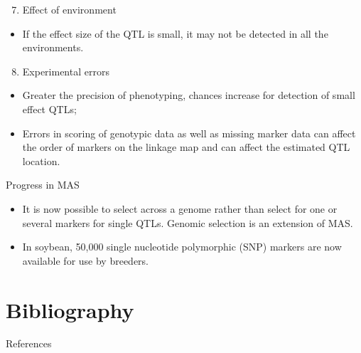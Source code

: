 \documentclass[
  ignorenonframetext,
  aspectratio=169]{beamer}
\providecommand{\tightlist}{%
  \setlength{\itemsep}{0pt}\setlength{\parskip}{0pt}}
\begin{document}
\begin{frame}{}
\protect\hypertarget{section-4}{}
\begin{enumerate}
\setcounter{enumi}{6}
\tightlist
\item
  Effect of environment
\end{enumerate}

\begin{itemize}
\tightlist
\item
  If the effect size of the QTL is small, it may not be detected in all
  the environments.
\end{itemize}

\begin{enumerate}
\setcounter{enumi}{7}
\tightlist
\item
  Experimental errors
\end{enumerate}

\begin{itemize}
\tightlist
\item
  Greater the precision of phenotyping, chances increase for detection
  of small effect QTLs;
\item
  Errors in scoring of genotypic data as well as missing marker data can
  affect the order of markers on the linkage map and can affect the
  estimated QTL location.
\end{itemize}
\end{frame}

\begin{frame}{Progress in MAS}
\protect\hypertarget{progress-in-mas}{}
\begin{itemize}
\tightlist
\item
  It is now possible to select across a genome rather than select for
  one or several markers for single QTLs. Genomic selection is an
  extension of MAS.
\item
  In soybean, 50,000 single nucleotide polymorphic (SNP) markers are now
  available for use by breeders.
\end{itemize}
\end{frame}

\hypertarget{bibliography}{%
\section{Bibliography}\label{bibliography}}

\begin{frame}{References}
\protect\hypertarget{references}{}
\end{frame}
\end{document}
